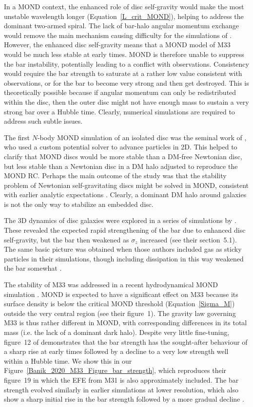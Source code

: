 \documentclass[fleqn,usenatbib,useAMS]{mnras} %
\begin{document}
In a MOND context, the enhanced role of disc self-gravity would make the most unstable wavelength longer (Equation~\ref{L_crit_MOND}), helping to address the dominant two-armed spiral. The lack of bar-halo angular momentum exchange would remove the main mechanism causing difficulty for the simulations of \citet{Sellwood_2019}. However, the enhanced disc self-gravity means that a MOND model of M33 would be much less stable at early times. MOND is therefore unable to suppress the bar instability, potentially leading to a conflict with observations. Consistency would require the bar strength to saturate at a rather low value consistent with observations, or for the bar to become very strong and then get destroyed. This is theoretically possible because if angular momentum can only be redistributed within the disc, then the outer disc might not have enough mass to sustain a very strong bar over a Hubble time. Clearly, numerical simulations are required to address such subtle issues.

The first $N$-body MOND simulation of an isolated disc was the seminal work of \citet{Brada_1999}, who used a custom potential solver to advance particles in 2D. This helped to clarify that MOND discs would be more stable than a DM-free Newtonian disc, but less stable than a Newtonian disc in a DM halo adjusted to reproduce the MOND RC. Perhaps the main outcome of the study was that the stability problem of Newtonian self-gravitating discs \citep[e.g.][]{Hohl_1971} might be solved in MOND, consistent with earlier analytic expectations \citep{Milgrom_1989}. Clearly, a dominant DM halo around galaxies is not the only way to stabilize an embedded disc.

The 3D dynamics of disc galaxies were explored in a series of simulations by \citet{Tiret_2007}. These revealed the expected rapid strengthening of the bar due to enhanced disc self-gravity, but the bar then weakened as $\sigma_z$ increased (see their section~5.1). The same basic picture was obtained when those authors included gas as sticky particles in their simulations, though including dissipation in this way weakened the bar somewhat \citep{Tiret_2008_gas}.

The stability of M33 was addressed in a recent hydrodynamical MOND simulation \citep{Banik_2020_M33}. MOND is expected to have a significant effect on M33 because its surface density is below the critical MOND threshold (Equation~\ref{Sigma_M}) outside the very central region (see their figure~1). The gravity law governing M33 is thus rather different in MOND, with corresponding differences in its total mass (i.e. the lack of a dominant dark halo). Despite very little fine-tuning, figure~12 of \citet{Banik_2020_M33} demonstrates that the bar strength has the sought-after behaviour of a sharp rise at early times followed by a decline to a very low strength well within a Hubble time. We show this in our Figure~\ref{Banik_2020_M33_Figure_bar_strength}, which reproduces their figure~19 in which the EFE from M31 is also approximately included. The bar strength evolved similarly in earlier simulations at lower resolution, which also show a sharp initial rise in the bar strength followed by a more gradual decline \citep{Tiret_2007, Tiret_2008_gas}.
\end{document}

